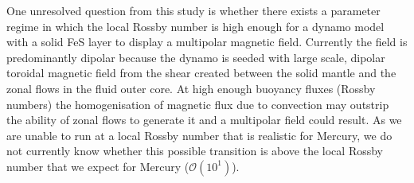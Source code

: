 One unresolved question from this study is whether there exists a parameter regime in which the local Rossby number is high enough for a dynamo model with a solid FeS layer to display a multipolar magnetic field. Currently the field is predominantly dipolar because the dynamo is seeded with large scale, dipolar toroidal magnetic field from the shear created between the solid mantle and the zonal flows in the fluid outer core. At high enough buoyancy fluxes (Rossby numbers) the homogenisation of magnetic flux due to convection may outstrip the ability of zonal flows to generate it and a multipolar field could result. As we are unable to run at a local Rossby number that is realistic for Mercury, we do not currently know whether this possible transition is above the local Rossby number that we expect for Mercury ($\mathcal{O}\left(10^1\right)$).
%
%
%
%

